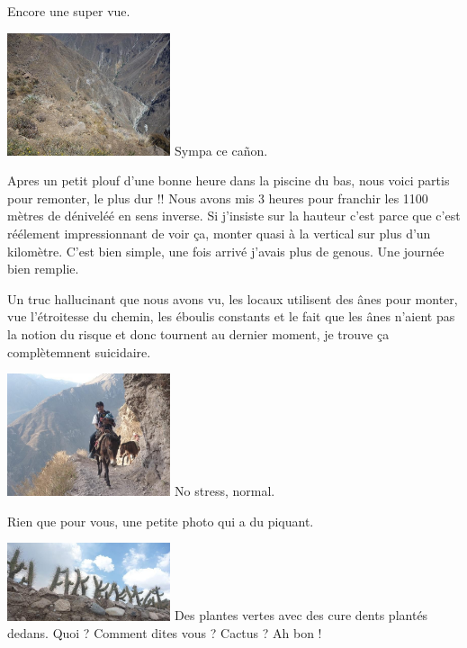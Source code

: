 \begin{multicols}{2}
Encore une super vue.

\hspace*{-0.65cm}
\includegraphics[width=4.8cm]{articles/Arequipa-colca-titicaca/1256607348QGMH.jpg}
Sympa ce cañon.

Apres un petit plouf d'une bonne heure dans la piscine du bas, nous voici partis pour remonter, le plus dur !! Nous avons mis 3 heures pour franchir les 1100 mètres de déniveléé en sens inverse. Si j'insiste sur la hauteur c'est parce que c'est réélement impressionnant de voir ça, monter quasi à la vertical sur plus d'un kilomètre. C'est bien simple, une fois arrivé j'avais plus de genous. Une journée bien remplie.

Un truc hallucinant que nous avons vu, les locaux utilisent des ânes pour monter, vue l'étroitesse du chemin, les éboulis constants et le fait que les ânes n'aient pas la notion du risque et donc tournent au dernier moment, je trouve ça complètemnent suicidaire.

\hspace*{-0.65cm}
\includegraphics[width=4.8cm]{articles/Arequipa-colca-titicaca/1256607366kAzy.jpg}
No stress, normal.

Rien que pour vous, une petite photo qui a du piquant.

\hspace*{-0.65cm}
\includegraphics[width=4.8cm]{articles/Arequipa-colca-titicaca/1256607370Azvi.jpg}
Des plantes vertes avec des cure dents plantés dedans. Quoi ? Comment dites vous ? Cactus ? Ah bon !


\end{multicols}
